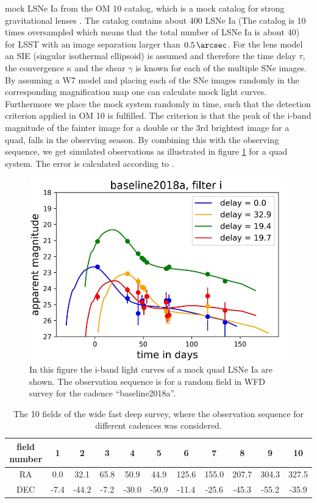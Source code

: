 mock LSNe Ia from the OM 10 catalog, which is a mock catalog for
strong gravitational lenses \citep{Oguri:2010}. The catalog contains
about 400 LSNe Ia (The catalog is 10 times oversampled which means
that the total number of LSNe Ia is about 40) for LSST with an image
separation larger than $\SI{0.5}{\arcsec}$. For the lens model an SIE
(singular isothermal ellipsoid) \citep{Kormann:1994} is assumed and
therefore the time delay $\tau$, the convergence $\kappa$ and the
shear $\gamma$ is known for each of the multiple SNe images. By
assuming a W7 model and placing each of the SNe images randomly in the
corresponding magnification map one can calculate mock light
curves. Furthermore we place the mock system randomly in time, such
that the detection criterion applied in OM 10 is fulfilled. The
criterion is that the peak of the i-band magnitude of the fainter image
for a double or the 3rd brightest image for a quad, falls in the
observing season.
By combining this with the observing sequence, we get simulated
observations as illustrated in figure \ref{fig: simulated observation}
for a quad system. The error is calculated according to \cite[sec 3.5,
p. 67]{2009:LSSTscience}.
\begin{figure}[h!]
\centering
\includegraphics[scale=0.7]{figures/sl_Obsevation_number399_baseline2018a_filter_i_oversampling_00.pdf}
\caption[]{In this figure the i-band light curves of a mock quad LSNe Ia are shown. The observation sequence is for a random field in WFD survey for the cadence ``baseline2018a''.}
\label{fig: simulated observation}
\end{figure}
%
\begin{table}
\centering
\begin{tabular}{c|c|c|c|c|c|c|c|c|c|c}
field number & 1 & 2 & 3 & 4 & 5& 6 & 7 & 8 & 9 & 10  \\
\hline
RA& 0.0 & 32.1 & 65.8 & 50.9 &44.9& 125.6 & 155.0 & 207.7 & 304.3 & 327.5  \\
\hline
DEC& -7.4 & -44.2 & -7.2 & -30.0 & -50.9& -11.4 & -25.6 & -45.3 & -55.2 & -35.9  \\
\end{tabular}
\caption{The 10 fields of the wide fast deep survey, where the observation sequence for different cadences was considered.}
\label{tab: 10 wfd fields}
\end{table}
%


